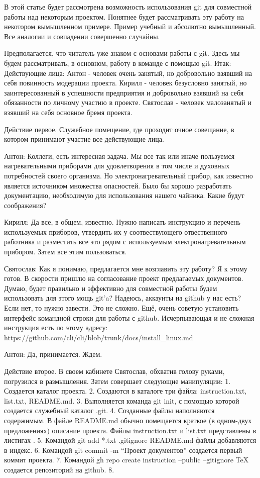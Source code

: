 В этой статье будет рассмотрена возможность использования git для совместной работы над 
некоторым проектом. Понятнее будет рассматривать эту работу на некотором вымышленном примере. 
Пример учебный и абсолютно вымышленный. Все аналогии и совпадении совершенно случайны.

Предполагается, что читатель уже знаком с основами работы с git. Здесь мы будем рассматривать,
в основном, работу в команде с помощью git.
Итак:
Действующие лица:
Антон - человек очень занятый, но добровольно взявший на себя повинность модерации проекта.
Кирилл - человек безусловно занятый, но заинтересованный в успешности предприятия и добровольно
взявший на себя обязанности по личному участию в проекте.
Святослав - человек малозанятый и взявший на себя основное бремя проекта.

Действие первое. 
Служебное помещение, где проходит очное совещание, в котором принимают участие все действующие лица.

Антон: Коллеги, есть интересная задача. Мы все так или иначе пользуемся нагревательными приборами
для удовлетворения в том числе и духовных потребностей своего организма. Но электронагревательный 
прибор, как известно является источником множества опасностей. Было бы хорошо разработать
документацию, необходимую для использования нашего чайника. Какие будут соображения?

Кирилл: Да все, в общем, известно. Нужно написать инструкцию и перечень используемых приборов, 
утвердить их у соотвествующего отвественного работника и разместить все это рядом с используемым
электронагревательным прибором. Затем все этим пользоваться. 

Святослав: Как я понимаю, предлагается мне возглавить эту работу? Я к этому готов. В скорости
пришлю на согласование проект предлагаемых документов. Думаю, будет правильно и эффективно
для совместной работы будем использовать для этого мощь git'a? Надеюсь, аккаунты на github у нас есть?
Если нет, то нужно завести. Это не сложно. Ещё, очень советую установить интерфейс командной
строки для работы с github. Исчерпывающая и не сложная инструкция есть по этому адресу:
https://github.com/cli/cli/blob/trunk/docs/install\_linux.md

Антон: Да, принимается. Ждем.

Действие второе.
В своем кабинете Святослав, обхватив голову руками, погрузился в размышления.
Затем совершает следующие манипуляции:
1. Создается каталог проекта.
2. Создаются в каталоге три файла: instruction.txt, list.txt, README.md.
3. Выполняется команда git init, с помощью которой создается служебный каталог .git.
4. Созданные файлы наполняются содержимым. В файле README.md обычно помещается краткое (в одном-двух
предложениях) описание проекта. Файлы instruction.txt и list.txt представлены в листигах .
5. Командой git add *.txt .gitignore README.md файлы добавляются в индекс.
6. Командой git commit -m ``Проект документов'' создается первый коммит проекта.
7. Командой
 gh repo create instruction --public --gitignore TeX
	создается репозиторий на github.
8. 


